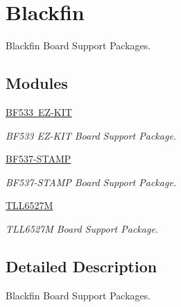 \hypertarget{group__RTEMSBSPsBfin}{}\section{Blackfin}
\label{group__RTEMSBSPsBfin}


Blackfin Board Support Packages.  


\subsection*{Modules}
\begin{DoxyCompactItemize}
\item 
\mbox{\hyperlink{group__RTEMSBSPsBfinEZKit533}{B\+F533 E\+Z-\/\+K\+IT}}
\begin{DoxyCompactList}\small\item\em B\+F533 E\+Z-\/\+K\+IT Board Support Package. \end{DoxyCompactList}\item 
\mbox{\hyperlink{group__RTEMSBSPsBfinBF537Stamp}{B\+F537-\/\+S\+T\+A\+MP}}
\begin{DoxyCompactList}\small\item\em B\+F537-\/\+S\+T\+A\+MP Board Support Package. \end{DoxyCompactList}\item 
\mbox{\hyperlink{group__RTEMSBSPsBfinTLL6527M}{T\+L\+L6527M}}
\begin{DoxyCompactList}\small\item\em T\+L\+L6527M Board Support Package. \end{DoxyCompactList}\end{DoxyCompactItemize}


\subsection{Detailed Description}
Blackfin Board Support Packages. 

